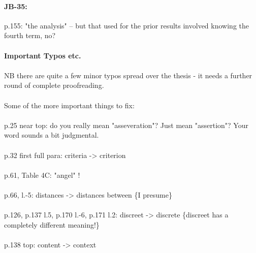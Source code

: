 \documentclass[11pt,a4paper]{article}
\begin{document}
\paragraph{JB-35:} p.155: "the analysis" -- but that used for the prior results involved knowing the fourth term, no?

\paragraph{Important Typos etc.}

\paragraph{}NB there are quite a few minor typos spread over the thesis - it needs a further round of complete proofreading.

\paragraph{} Some of the more important things to fix:

\paragraph{} p.25 near top: do you really mean "asseveration"? Just mean "assertion"? Your word sounds a bit judgmental.

\paragraph{} p.32 first full para:  criteria -> criterion

\paragraph{} p.61, Table 4C: "angel" !

\paragraph{} p.66, l.-5: distances -> distances between \{I presume\}

\paragraph{} p.126,   p.137 l.5,   p.170 l.-6,   p.171 l.2: discreet -> discrete \{discreet has a completely different meaning!\}

\paragraph{} p.138 top: content -> context 
\end{document}
